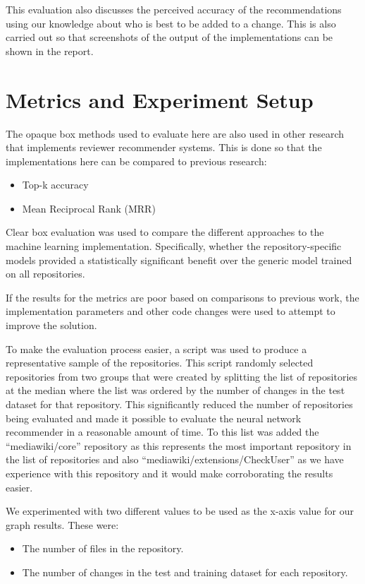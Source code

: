 This evaluation also discusses the perceived accuracy of the recommendations using our knowledge about who is best to be added to a change. This is also carried out so that screenshots of the output of the implementations can be shown in the report.

\section{Metrics and Experiment Setup}

The opaque box methods used to evaluate here are also used in other research that implements reviewer recommender systems. This is done so that the implementations here can be compared to previous research:
\begin{itemize}
    \item Top-k accuracy \citep[p. 939]{6606642} \citep[p. 506]{9240650} \citep[p. 147]{7081824}
    \item Mean Reciprocal Rank (MRR) \citep[p. 147]{7081824} \citep[p. 506]{9240650} \citep[p. 536]{7328331}
\end{itemize}

Clear box evaluation was used to compare the different approaches to the machine learning implementation. Specifically, whether the repository-specific models provided a statistically significant benefit over the generic model trained on all repositories.

If the results for the metrics are poor based on comparisons to previous work, the implementation parameters and other code changes were used to attempt to improve the solution.

To make the evaluation process easier, a script was used to produce a representative sample of the repositories. This script randomly selected repositories from two groups that were created by splitting the list of repositories at the median where the list was ordered by the number of changes in the test dataset for that repository. This significantly reduced the number of repositories being evaluated and made it possible to evaluate the neural network recommender in a reasonable amount of time. To this list was added the ``mediawiki/core'' repository as this represents the most important repository in the list of repositories and also ``mediawiki/extensions/CheckUser'' as we have experience with this repository and it would make corroborating the results easier.

We experimented with two different values to be used as the x-axis value for our graph results. These were:
\begin{itemize}
    \item The number of files in the repository.
    \item The number of changes in the test and training dataset for each repository.
\end{itemize}

